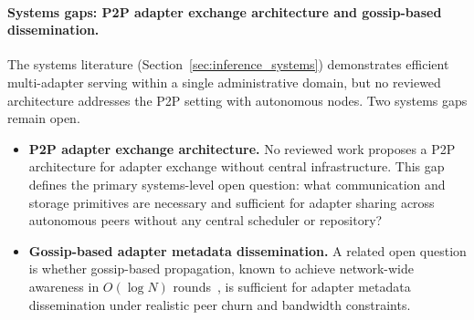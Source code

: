 \paragraph{Systems gaps: P2P adapter exchange architecture and gossip-based dissemination.}
The systems literature (Section~\ref{sec:inference_systems}) demonstrates efficient multi-adapter serving within a single administrative domain, but no reviewed architecture addresses the P2P setting with autonomous nodes. Two systems gaps remain open.
\begin{itemize}
  \item \textbf{P2P adapter exchange architecture.} No reviewed work proposes a P2P architecture for adapter exchange without central infrastructure. This gap defines the primary
    systems-level open question: what communication and storage primitives are
    necessary and sufficient for adapter sharing across autonomous peers without
    any central scheduler or repository?
  \item \textbf{Gossip-based adapter metadata dissemination.} A related open question
    is whether gossip-based propagation, known to achieve network-wide awareness
    in $O(\log N)$ rounds~\cite{KarpRumor2000}, is sufficient for adapter
    metadata dissemination under realistic peer churn and bandwidth constraints.
\end{itemize}

